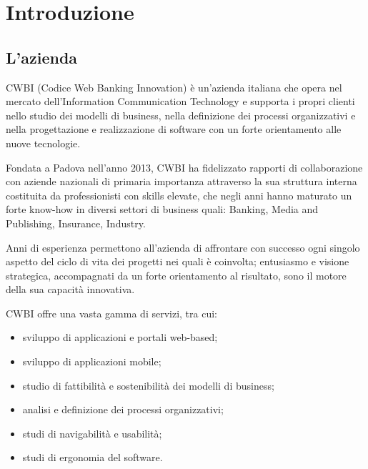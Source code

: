 \chapter{Introduzione}
\label{cap:introduzione}


\setlength{\parskip}{3ex}

\section{L'azienda}

CWBI (Codice Web Banking Innovation) è un’azienda italiana che opera nel mercato dell'Information Communication Technology e supporta i propri clienti nello studio dei modelli di business, nella definizione dei processi organizzativi e nella progettazione e realizzazione di software con un forte orientamento alle nuove tecnologie.

\setlength{\parskip}{3ex}

\noindent Fondata a Padova nell'anno 2013, CWBI ha fidelizzato rapporti di collaborazione con aziende nazionali di primaria importanza attraverso la sua struttura interna costituita da professionisti con skills elevate, che negli anni hanno maturato un forte know-how in diversi settori di business quali: Banking, Media and Publishing, Insurance, Industry.

\setlength{\parskip}{3ex}

\noindent Anni di esperienza permettono all'azienda di affrontare con successo ogni singolo aspetto del ciclo di vita dei progetti nei quali è coinvolta; entusiasmo e visione strategica, accompagnati da un forte orientamento al risultato, sono il motore della sua capacità innovativa.

\setlength{\parskip}{3ex}

\noindent CWBI offre una vasta gamma di servizi, tra cui:
\begin{itemize}
\item sviluppo di applicazioni e portali web-based;
\item sviluppo di applicazioni mobile;
\item studio di fattibilità e sostenibilità dei modelli di business;
\item analisi e definizione dei processi organizzativi;
\item studi di navigabilità e usabilità;
\item studi di ergonomia del software.
\end{itemize}

